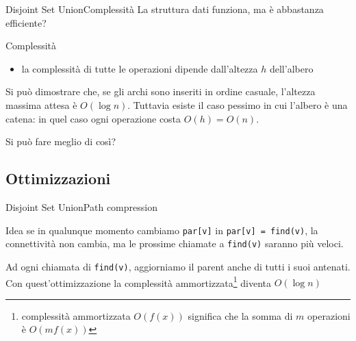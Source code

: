\documentclass[compress]{beamer}
\begin{document}
\begin{frame}[plain]
\end{frame}

\begin{frame}{Disjoint Set Union}{Complessit\`a}
    La struttura dati funziona, ma \`e abbastanza efficiente?
    \pause
    \begin{block}{Complessit\`a}
    \begin{itemize}
        \item la complessit\`a di tutte le operazioni dipende dall'altezza $h$ dell'albero
    \end{itemize}
    \end{block}
    \pause
    Si pu\`o dimostrare che, se gli archi sono inseriti in ordine casuale, l'altezza massima attesa \`e $O(\log n)$.
    Tuttavia esiste il caso pessimo in cui l'albero \`e una catena: in quel caso ogni operazione costa $O(h) = O(n)$.
    \pause

    Si pu\`o fare meglio di cos\`i?
\end{frame}

\subsection{Ottimizzazioni}
\begin{frame}{Disjoint Set Union}{Path compression}
    \begin{block}{Idea}
        se in qualunque momento cambiamo \texttt{par[v]} in \texttt{par[v] = find(v)}, la connettivit\`a non cambia, ma le prossime chiamate a \texttt{find(v)} saranno pi\`u veloci.
    \end{block}
    Ad ogni chiamata di \texttt{find(v)}, aggiorniamo il parent anche di tutti i suoi antenati.
    \vfill
    Con quest'ottimizzazione la complessit\`a ammortizzata\footnote{complessit\`a ammortizzata $O(f(x))$ significa che la somma di $m$ operazioni \`e $O(m f(x))$} diventa $O(\log n)$
\end{frame}
\end{document}
